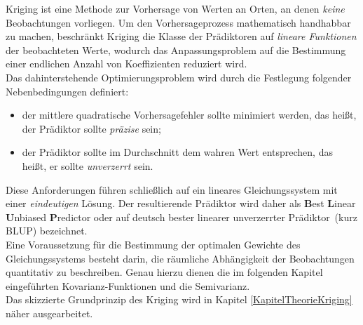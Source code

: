 Kriging ist eine Methode zur Vorhersage von Werten an Orten, 
an denen \textit{keine} Beobachtungen vorliegen.  
Um den Vorhersageprozess mathematisch handhabbar zu machen, 
beschränkt Kriging die Klasse der Prädiktoren auf 
\textit{lineare Funktionen} der beobachteten Werte,
wodurch das Anpassungsproblem auf die Bestimmung einer endlichen
Anzahl von Koeffizienten reduziert wird. \\

Das dahinterstehende Optimierungsproblem wird durch die
Festlegung folgender Nebenbedingungen definiert:

\begin{itemize}[topsep=2pt,parsep=1pt,itemsep=0.5pt]
\item[1) ] der mittlere quadratische Vorhersagefehler sollte minimiert werden, das heißt, der Prädiktor sollte \textit{präzise} sein; 
\item[2) ] der Prädiktor sollte im Durchschnitt dem wahren Wert
entsprechen, das heißt, er sollte \textit{unverzerrt} sein.
\end{itemize}

Diese Anforderungen führen schließlich auf ein lineares Gleichungssystem mit 
einer \textit{eindeutigen} Lösung. 
Der resultierende Prädiktor wird daher als \textbf{B}est 
\textbf{L}inear \textbf{U}nbiased \textbf{P}redictor oder auf
deutsch \glqq bester linearer unverzerrter Prädiktor\grqq\ (kurz BLUP)
bezeichnet.\\
Eine Voraussetzung für die Bestimmung der optimalen Gewichte des
Gleichungssystems besteht darin, die 
räumliche Abhängigkeit der Beobachtungen quantitativ zu beschreiben. 
Genau hierzu dienen die im folgenden Kapitel eingeführten 
Kovarianz-Funktionen und die Semivarianz.\\

Das skizzierte Grundprinzip des Kriging wird in Kapitel 
\ref{KapitelTheorieKriging} näher ausgearbeitet.


